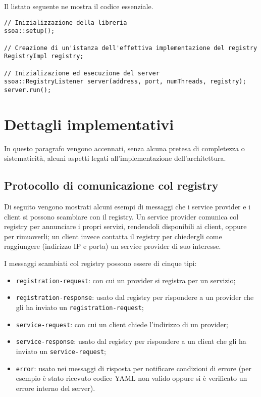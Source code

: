 \documentclass[a4paper,twoside]{article}
\newcommand\code{\lstinline[basicstyle=\normalsize\ttfamily]}
\begin{document}
Il listato seguente ne mostra il codice essenziale.

\begin{lstlisting}
// Inizializzazione della libreria
ssoa::setup();

// Creazione di un'istanza dell'effettiva implementazione del registry
RegistryImpl registry;

// Inizializazione ed esecuzione del server
ssoa::RegistryListener server(address, port, numThreads, registry);
server.run();
\end{lstlisting}


\section{Dettagli implementativi}

In questo paragrafo vengono accennati, senza alcuna pretesa di completezza o sistematicità, alcuni aspetti legati all'implementazione dell'architettura.


\subsection{Protocollo di comunicazione col registry}

Di seguito vengono mostrati alcuni esempi di messaggi che i service provider e i client si possono scambiare con il registry. Un service provider comunica col registry per annunciare i propri servizi, rendendoli disponibili ai client, oppure per rimuoverli; un client invece contatta il registry per chiedergli come raggiungere (indirizzo IP e porta) un service provider di suo interesse.

I messaggi scambiati col registry possono essere di cinque tipi:
\begin{itemize}
\item \code|registration-request|: con cui un provider si registra per un servizio;
\item \code|registration-response|: usato dal registry per rispondere a un provider che gli ha inviato un \code|registration-request|;
\item \code|service-request|: con cui un client chiede l'indirizzo di un provider;
\item \code|service-response|: usato dal registry per rispondere a un client che gli ha inviato un \code|service-request|;
\item \code|error|: usato nei messaggi di risposta per notificare condizioni di errore (per esempio è stato ricevuto codice YAML non valido oppure si è verificato un errore interno del server).
\end{itemize}
\end{document}
